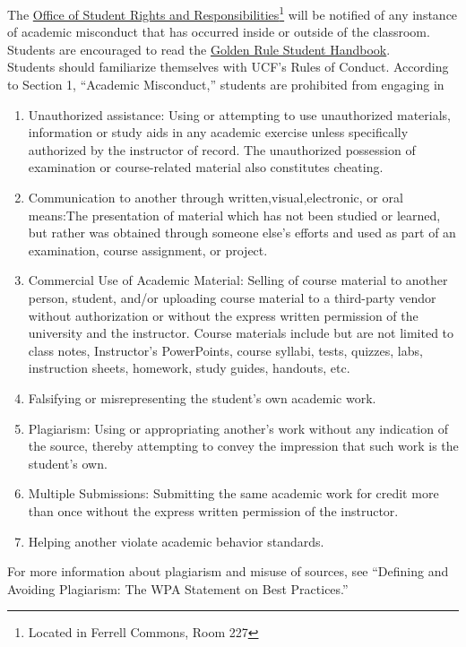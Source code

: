 \documentclass[11pt]{paper}
\begin{document}
The \href{https://osrr.sdes.ucf.edu/}{Office of Student Rights and Responsibilities}\footnote{Located in Ferrell Commons, Room 227} will be notified of any instance of academic misconduct that has occurred inside or outside of the classroom. Students are encouraged to read the \href{https://goldenrule.sdes.ucf.edu/}{Golden Rule Student Handbook}.\\

Students should familiarize themselves with UCF’s Rules of Conduct. According to Section 1, ``Academic Misconduct,'' students are prohibited from engaging in
\begin{enumerate}
\item Unauthorized assistance: Using or attempting to use unauthorized materials, information or study aids in any academic exercise unless specifically authorized by the instructor of record. The unauthorized possession of examination or course-related material also constitutes cheating.
\item Communication to another through written,visual,electronic, or oral means:The presentation of material which has not been studied or learned, but rather was obtained through someone else’s efforts and used as part of an examination, course assignment, or project.
\item Commercial Use of Academic Material: Selling of course material to another person, student, and/or uploading course material to a third-party vendor without authorization or without the express written permission of the university and the instructor. Course materials include but are not limited to class notes, Instructor’s PowerPoints, course syllabi, tests, quizzes, labs, instruction sheets, homework, study guides, handouts, etc.
\item Falsifying or misrepresenting the student’s own academic work.
\item Plagiarism: Using or appropriating another’s work without any indication of the source, thereby attempting to convey the impression that such work is the student’s own.
\item Multiple Submissions: Submitting the same academic work for credit more than once without the express written permission of the instructor.
\item Helping another violate academic behavior standards.
\end{enumerate}
For more information about plagiarism and misuse of sources, see ``Defining and Avoiding Plagiarism: The WPA Statement on Best Practices.''\\
\end{document}
